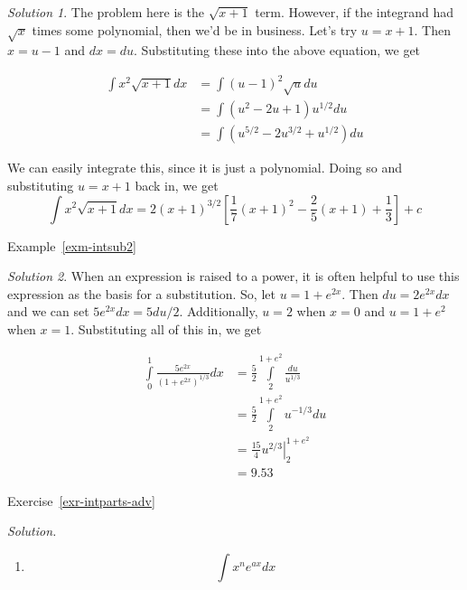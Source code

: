 \documentclass[
  letterpaper,
]{book}
\providecommand{\tightlist}{%
  \setlength{\itemsep}{0pt}\setlength{\parskip}{0pt}}\usepackage{longtable,booktabs,array}
\theoremstyle{definition}
\theoremstyle{definition}
\theoremstyle{plain}
\theoremstyle{definition}
\theoremstyle{plain}
\theoremstyle{plain}
\theoremstyle{remark}
\newtheorem*{solution}{Solution}
\begin{document}
\begin{solution}

The problem here is the \(\sqrt{x+1}\) term. However, if the integrand
had \(\sqrt{x}\) times some polynomial, then we'd be in business. Let's
try \(u=x+1\). Then \(x=u-1\) and \(dx=du\). Substituting these into the
above equation, we get

\begin{align*}
            \int x^2\sqrt{x+1}dx&= \int (u-1)^2\sqrt{u}du\\
            &= \int (u^2-2u+1)u^{1/2}du\\
            &= \int (u^{5/2}-2u^{3/2}+u^{1/2})du
\end{align*}

We can easily integrate this, since it is just a polynomial. Doing so
and substituting \(u=x+1\) back in, we get
\[\int x^2\sqrt{x+1}dx=2(x+1)^{3/2}\left[\frac{1}{7}(x+1)^2 -
\frac{2}{5}(x+1)+\frac{1}{3}\right]+c\]

\end{solution}

Example~\ref{exm-intsub2}

\begin{solution}

When an expression is raised to a power, it is often helpful to use this
expression as the basis for a substitution. So, let \(u=1+e^{2x}\). Then
\(du=2e^{2x}dx\) and we can set \(5e^{2x}dx=5du/2\). Additionally,
\(u=2\) when \(x=0\) and \(u=1+e^2\) when \(x=1\). Substituting all of
this in, we get

\begin{align*}
\int\limits_0^1 \frac{5e^{2x}}{(1+e^{2x})^{1/3}}dx
            &= \frac{5}{2}\int\limits_2^{1+e^2}\frac{du}{u^{1/3}}\\
            &= \frac{5}{2}\int\limits_2^{1+e^2} u^{-1/3}du\\
            &= \left. \frac{15}{4} u^{2/3} \right|_2^{1+e^2}\\
            &= 9.53
\end{align*}

\end{solution}

Exercise~\ref{exr-intparts-adv}

\emph{Solution.}

\begin{enumerate}
\def\labelenumi{\arabic{enumi}.}
\tightlist
\item
  \[\int x^n e^{ax} dx\]
\end{enumerate}
\end{document}
